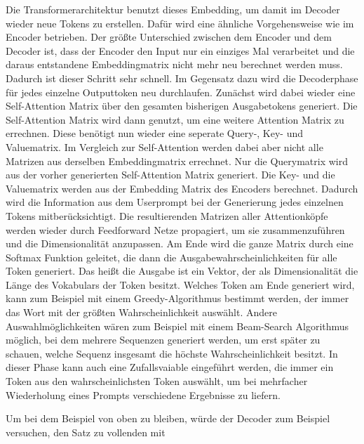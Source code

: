 Die Transformerarchitektur benutzt dieses Embedding, um damit im Decoder wieder neue Tokens zu erstellen.
Dafür wird eine ähnliche Vorgehensweise wie im Encoder betrieben.
Der größte Unterschied zwischen dem Encoder und dem Decoder ist, dass der Encoder den Input nur ein einziges Mal verarbeitet und die daraus entstandene Embeddingmatrix nicht mehr neu berechnet werden muss.
Dadurch ist dieser Schritt sehr schnell.
Im Gegensatz dazu wird die Decoderphase für jedes einzelne Outputtoken neu durchlaufen.
Zunächst wird dabei wieder eine Self-Attention Matrix über den gesamten bisherigen Ausgabetokens generiert.
Die Self-Attention Matrix wird dann genutzt, um eine weitere Attention Matrix zu errechnen.
Diese benötigt nun wieder eine seperate Query-, Key- und Valuematrix.
Im Vergleich zur Self-Attention werden dabei aber nicht alle Matrizen aus derselben Embeddingmatrix errechnet.
Nur die Querymatrix wird aus der vorher generierten Self-Attention Matrix generiert.
Die Key- und die Valuematrix werden aus der Embedding Matrix des Encoders berechnet. 
Dadurch wird die Information aus dem Userprompt bei der Generierung jedes einzelnen Tokens mitberücksichtigt. 
Die resultierenden Matrizen aller Attentionköpfe werden wieder durch Feedforward Netze propagiert, um sie zusammenzuführen und die Dimensionalität anzupassen.
Am Ende wird die ganze Matrix durch eine Softmax Funktion geleitet, die dann die Ausgabewahrscheinlichkeiten für alle Token generiert.
Das heißt die Ausgabe ist ein Vektor, der als Dimensionalität die Länge des Vokabulars der Token besitzt.
Welches Token am Ende generiert wird, kann zum Beispiel mit einem Greedy-Algorithmus bestimmt werden, der immer das Wort mit der größten Wahrscheinlichkeit auswählt.
Andere Auswahlmöglichkeiten wären zum Beispiel mit einem Beam-Search Algorithmus möglich, bei dem mehrere Sequenzen generiert werden, um erst später zu schauen, welche Sequenz insgesamt die höchste Wahrscheinlichkeit besitzt.
In dieser Phase kann auch eine Zufallsvaiable eingeführt werden, die immer ein Token aus den wahrscheinlichsten Token auswählt, um bei mehrfacher Wiederholung eines Prompts verschiedene Ergebnisse zu liefern.

Um bei dem Beispiel von oben zu bleiben, würde der Decoder zum Beispiel versuchen, den Satz zu vollenden mit ~\cite{vaswani2023}



